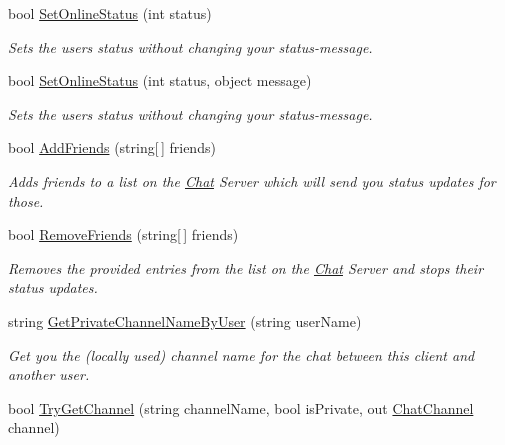 \begin{DoxyCompactItemize}
bool \hyperlink{class_exit_games_1_1_client_1_1_photon_1_1_chat_1_1_chat_client_af3dade275735d7490a9872e965e6830f}{Set\+Online\+Status} (int status)
\begin{DoxyCompactList}\small\item\em Sets the user\textquotesingle{}s status without changing your status-\/message. \end{DoxyCompactList}\item 
bool \hyperlink{class_exit_games_1_1_client_1_1_photon_1_1_chat_1_1_chat_client_a9ae2d62c65f72f1ebea7b22ca8ce3b91}{Set\+Online\+Status} (int status, object message)
\begin{DoxyCompactList}\small\item\em Sets the user\textquotesingle{}s status without changing your status-\/message. \end{DoxyCompactList}\item 
bool \hyperlink{class_exit_games_1_1_client_1_1_photon_1_1_chat_1_1_chat_client_a66aa30bff5ca81b1a1811d8e36b09546}{Add\+Friends} (string\mbox{[}$\,$\mbox{]} friends)
\begin{DoxyCompactList}\small\item\em Adds friends to a list on the \hyperlink{namespace_exit_games_1_1_client_1_1_photon_1_1_chat}{Chat} Server which will send you status updates for those. \end{DoxyCompactList}\item 
bool \hyperlink{class_exit_games_1_1_client_1_1_photon_1_1_chat_1_1_chat_client_a8071d5a27bc1828fdcb19deee57deac2}{Remove\+Friends} (string\mbox{[}$\,$\mbox{]} friends)
\begin{DoxyCompactList}\small\item\em Removes the provided entries from the list on the \hyperlink{namespace_exit_games_1_1_client_1_1_photon_1_1_chat}{Chat} Server and stops their status updates. \end{DoxyCompactList}\item 
string \hyperlink{class_exit_games_1_1_client_1_1_photon_1_1_chat_1_1_chat_client_a24f6e608fc1b838de8de908c6756571f}{Get\+Private\+Channel\+Name\+By\+User} (string user\+Name)
\begin{DoxyCompactList}\small\item\em Get you the (locally used) channel name for the chat between this client and another user. \end{DoxyCompactList}\item 
bool \hyperlink{class_exit_games_1_1_client_1_1_photon_1_1_chat_1_1_chat_client_a518706086a60688c5dbe946e3b437491}{Try\+Get\+Channel} (string channel\+Name, bool is\+Private, out \hyperlink{class_exit_games_1_1_client_1_1_photon_1_1_chat_1_1_chat_channel}{Chat\+Channel} channel)

\end{DoxyCompactItemize}
